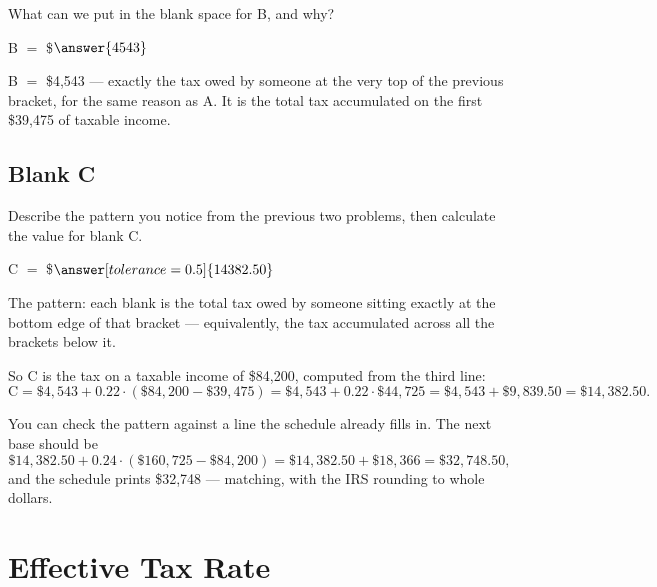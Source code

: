 \documentclass[12pt]{ximera}
\begin{document}
\begin{problem}
What can we put in the blank space for B, and why?

B $=$ \$$\answer{4543}$

\begin{freeResponse}
\end{freeResponse}

\begin{solution}
B $=$ \$4,543 --- exactly the tax owed by someone at the very top of the previous
bracket, for the same reason as A. It is the total tax accumulated on the first
\$39,475 of taxable income.
\end{solution}
\end{problem}

\subsection*{Blank C}

\begin{problem}
Describe the pattern you notice from the previous two problems, then calculate the value
for blank C.

C $=$ \$$\answer[tolerance=0.5]{14382.50}$

\begin{freeResponse}
\end{freeResponse}

\begin{solution}
The pattern: each blank is the total tax owed by someone sitting exactly at the bottom
edge of that bracket --- equivalently, the tax accumulated across all the brackets
below it.

So C is the tax on a taxable income of \$84,200, computed from the third line:
\[
\text{C} = \$4{,}543 + 0.22 \cdot (\$84{,}200 - \$39{,}475)
= \$4{,}543 + 0.22 \cdot \$44{,}725 = \$4{,}543 + \$9{,}839.50 = \$14{,}382.50.
\]

You can check the pattern against a line the schedule already fills in. The next base
should be
\[
\$14{,}382.50 + 0.24 \cdot (\$160{,}725 - \$84{,}200) = \$14{,}382.50 + \$18{,}366
= \$32{,}748.50,
\]
and the schedule prints \$32,748 --- matching, with the IRS rounding to whole dollars.
\end{solution}
\end{problem}

\section*{Effective Tax Rate}
\end{document}
